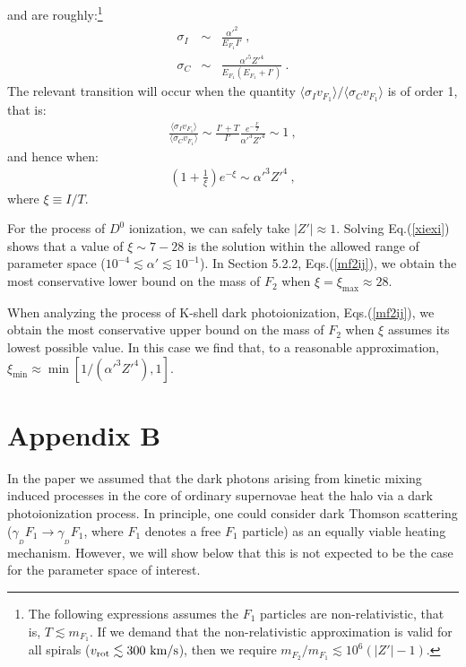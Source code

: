\documentclass[12pt]{article}
\begin{document}
{{\cite{lotz,kramers} and are roughly:\footnote{The following expressions
assumes the $F_1$ particles are non-relativistic, that is, $T \lesssim m
_{F_1}$. If we demand that the non-relativistic approximation is valid
for all spirals ($v _{\text{rot}} \lesssim 300 \ \rm km/s$), then we
require $m _{F_2}/m _{F_1} \lesssim 10 ^6(|Z'|-1)$.}
%
\begin{eqnarray}
\sigma _I & \sim & \frac{{\alpha '} ^2}{E_{F_1}I'} \ , \nonumber \\
\sigma _C & \sim & \frac{{\alpha '} ^5{Z'} ^4}{E _{F_1}(E _{F_1} + I')}
\ .
\end{eqnarray}
%
The relevant transition will occur when the quantity $\langle \sigma _Iv
_{F_1} \rangle / \langle \sigma _Cv _{F_1} \rangle$ is of order 1, that
is:
%
\begin{eqnarray}
\frac{\langle \sigma _Iv _{F_1} \rangle}{\langle \sigma _Cv _{F_1}
\rangle} \sim \frac{I'+T}{I'}\frac{e ^{-\frac{I'}{T}}}{{\alpha '} ^3{Z'}
^4} \sim 1 \ ,
\end{eqnarray}
%
and hence when:
%
\begin{eqnarray}
\left ( 1+\frac{1}{\xi} \right ) e ^{-\xi} \sim {\alpha '} ^3{Z'} ^4 \ ,
\label{xiexi}
\end{eqnarray}
%
where $\xi \equiv I/T$.

For the process of $D ^0$ ionization, we can safely take $|Z'| \approx
1$. Solving Eq.(\ref{xiexi}) shows that a value of $\xi \sim 7-28$ is
the solution within the allowed range of parameter space ($10 ^{-4}
\lesssim \alpha ' \lesssim 10 ^{-1}$). In Section 5.2.2,
Eqs.(\ref{mf2ij}), we obtain the most conservative lower bound on the
mass of $F_2$ when $\xi = \xi _{\max} \approx 28$.

When analyzing the process of K-shell dark photoionization,
Eqs.(\ref{mf2ij}), we obtain the most conservative upper bound on the
mass of $F_2$ when $\xi$ assumes its lowest possible value. In this case
we find that, to a reasonable approximation, $\xi _{\min} \approx \min
[1/({\alpha '} ^3{Z'} ^4),1]$.

\section*{Appendix B}

In the paper we assumed that the dark photons arising from kinetic
mixing induced processes in the core of ordinary supernovae heat the
halo via a dark photoionization process. In principle, one could
consider dark Thomson scattering ($\gamma _{_D}F_1 \rightarrow \gamma
_{_D}F_1$, where $F_1$ denotes a free $F_1$ particle) as an equally
viable heating mechanism. However, we will show below that this is not
expected to be the case for the parameter space of interest.

}}
\end{document}
